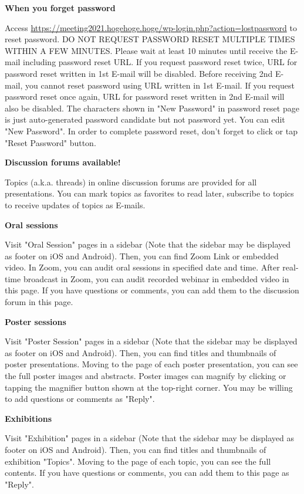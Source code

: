 \documentclass[titlepage,10pt,a4paper,uplatex]{jsbook}
\newenvironment{content}{\begin{shaded}\vspace{-1em}\raggedright\ttfamily\footnotesize\setlength{\baselineskip}{1.4em}}{\end{shaded}\vspace{-1em}}
\renewcommand{\textbf}[1]{{\bfseries\sffamily#1}}
\begin{document}
\begin{content}
\textbf{\Large When you forget password}

Access \url{https://meeting2021.hogehoge.hoge/wp-login.php?action=lostpassword} to reset password. DO NOT REQUEST PASSWORD RESET MULTIPLE TIMES WITHIN A FEW MINUTES. Please wait at least 10 minutes until receive the E-mail including password reset URL. If you request password reset twice, URL for password reset written in 1st E-mail will be disabled. Before receiving 2nd E-mail, you cannot reset password using URL written in 1st E-mail. If you request password reset once again, URL for password reset written in 2nd E-mail will also be disabled. The characters shown in "New Password" in password reset page is just auto-generated password candidate but not password yet. You can edit "New Password". In order to complete password reset, don't forget to click or tap "Reset Password" button.

\textbf{\Large Discussion forums available!}

Topics (a.k.a. threads) in online discussion forums are provided for all presentations. You can mark topics as favorites to read later, subscribe to topics to receive updates of topics as E-mails.

\textbf{\Large Oral sessions}

Visit "Oral Session" pages in a sidebar (Note that the sidebar may be displayed as footer on iOS and Android). Then, you can find Zoom Link or embedded video. In Zoom, you can audit oral sessions in specified date and time. After real-time broadcast in Zoom, you can audit recorded webinar in embedded video in this page. If you have questions or comments, you can add them to the discussion forum in this page.

\textbf{\Large Poster sessions}

Visit "Poster Session" pages in a sidebar (Note that the sidebar may be displayed as footer on iOS and Android). Then, you can find titles and thumbnails of poster presentations. Moving to the page of each poster presentation, you can see the full poster images and abstracts. Poster images can magnify by clicking or tapping the magnifier button shown at the top-right corner. You may be willing to add questions or comments as "Reply".

\textbf{\Large Exhibitions}

Visit "Exhibition" pages in a sidebar (Note that the sidebar may be displayed as footer on iOS and Android). Then, you can find titles and thumbnails of exhibition "Topics". Moving to the page of each topic, you can see the full contents. If you have questions or comments, you can add them to this page as "Reply".


\end{content}
\end{document}
